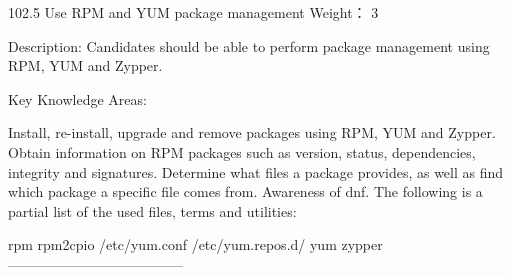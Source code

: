 102.5 Use RPM and YUM package management
Weight：  3

Description: Candidates should be able to perform package management using RPM, YUM and Zypper.

Key Knowledge Areas:

Install, re-install, upgrade and remove packages using RPM, YUM and Zypper.
Obtain information on RPM packages such as version, status, dependencies, integrity and signatures.
Determine what files a package provides, as well as find which package a specific file comes from.
Awareness of dnf.
The following is a partial list of the used files, terms and utilities:

rpm
rpm2cpio
/etc/yum.conf
/etc/yum.repos.d/
yum
zypper
--------------------------------------

